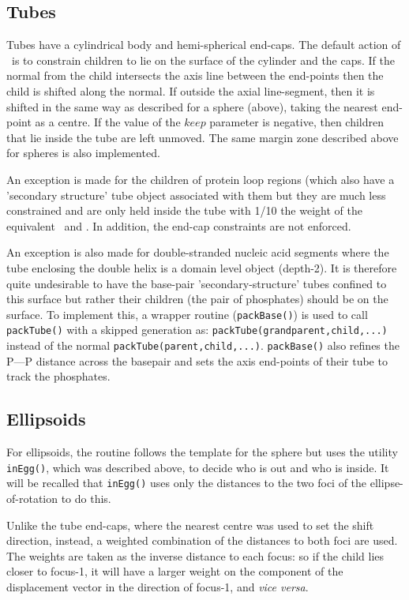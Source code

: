 \subsection{Tubes}

Tubes have a cylindrical body and hemi-spherical end-caps.  The default action of \NAME\ is to constrain
children to lie on the surface of the cylinder and the caps.   If the normal from the child intersects the axis
line between the end-points then the child is shifted along the normal.  If outside the axial line-segment,
then it is shifted in the same way as described for a sphere (above), taking the nearest end-point as a
centre.  If the value of the $keep$ parameter is negative, then children that lie inside the tube are left
unmoved.  The same margin zone described above for spheres is also implemented.

An exception is made for the children of protein loop regions (which also have a 'secondary structure'
tube object associated with them but they are much less constrained and are only held
inside the tube with 1/10 the weight of the equivalent \AH\ and \Bs.   In addition, the end-cap
constraints are not enforced.

An exception is also made for double-stranded nucleic acid segments where the tube enclosing the
double helix is a domain level object (depth-2).   It is therefore quite undesirable to have the
base-pair 'secondary-structure' tubes confined to this surface but rather their children (the pair
of phosphates) should be on the surface.  To implement this, a wrapper routine ({\tt packBase()})
is used to call {\tt packTube()} with a skipped generation as: {\tt packTube(grandparent,child,...)}
instead of the normal {\tt packTube(parent,child,...)}.  {\tt packBase()} also refines the P---P
distance across the basepair and sets the axis end-points of their tube to track the phosphates.

\subsection{Ellipsoids}

For ellipsoids, the  routine follows the template for the sphere but uses the utility {\tt inEgg()},
which was described above, to decide who is out and who is inside.   It will be recalled that
{\tt inEgg()} uses only the distances to the two foci of the ellipse-of-rotation to do this.

Unlike the tube end-caps, where the nearest centre was used to set the shift direction, instead, a
weighted combination of the distances to both foci are used.   The weights are taken as the inverse distance
to each focus: so if the child lies closer to focus-1, it will have a larger weight
on the component of the displacement vector in the direction of focus-1, and {\em vice versa}. 

